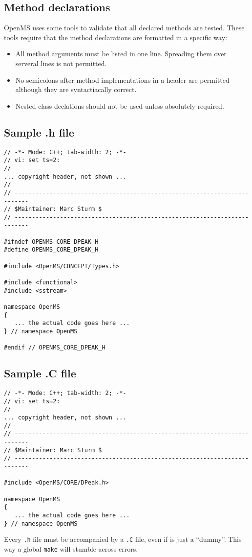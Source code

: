 \documentclass[a4]{article}
\begin{document}
\subsection{Method declarations}
OpenMS uses some tools to validate that all declared methods are tested.
These tools require that the method declarations are formatted in a specific
way:
\begin{itemize}
	\item All method arguments must be listed in one line. Spreading them over serveral lines is not permitted.
	\item No semicolons after method implementations in a header are permitted although they are syntactiacally correct.
	\item Nested class declations should not be used unless absolutely required.
\end{itemize}

\subsection{Sample .h file}

\begin{footnotesize}
\begin{verbatim}
// -*- Mode: C++; tab-width: 2; -*-
// vi: set ts=2:
//
... copyright header, not shown ...
//
// --------------------------------------------------------------------------
// $Maintainer: Marc Sturm $
// --------------------------------------------------------------------------

#ifndef OPENMS_CORE_DPEAK_H
#define OPENMS_CORE_DPEAK_H

#include <OpenMS/CONCEPT/Types.h>

#include <functional>
#include <sstream>

namespace OpenMS
{
   ... the actual code goes here ...
} // namespace OpenMS

#endif // OPENMS_CORE_DPEAK_H
\end{verbatim}
\end{footnotesize}

\subsection{Sample .C file}

\begin{footnotesize}
\begin{verbatim}
// -*- Mode: C++; tab-width: 2; -*-
// vi: set ts=2:
//
... copyright header, not shown ...
//
// --------------------------------------------------------------------------
// $Maintainer: Marc Sturm $
// --------------------------------------------------------------------------

#include <OpenMS/CORE/DPeak.h>

namespace OpenMS
{
   ... the actual code goes here ...
} // namespace OpenMS

\end{verbatim}
\end{footnotesize}
Every \texttt{.h} file must be accompanied by a \texttt{.C} file, even if is
just a ``dummy''.  This way a global \texttt{make} will
stumble across errors.
\end{document}
